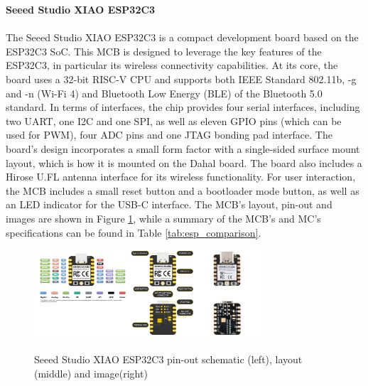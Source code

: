 \textbf{Seeed Studio XIAO ESP32C3}\\\\
The Seeed Studio XIAO ESP32C3 is a compact development board based on the ESP32C3 SoC. This MCB is designed to leverage the key features of the ESP32C3, in particular its wireless connectivity capabilities. At its core, the board uses a 32-bit RISC-V CPU and supports both IEEE Standard 802.11b, -g and -n (Wi-Fi 4) and Bluetooth Low Energy (BLE) of the Bluetooth 5.0 standard. 
In terms of interfaces, the chip provides four serial interfaces, including two UART, one I2C and one SPI, as well as eleven GPIO pins (which can be used for PWM), four ADC pins and one JTAG bonding pad interface. 
The board's design incorporates a small form factor with a single-sided surface mount layout, which is how it is mounted on the Dahal board. The board also includes a Hirose U.FL antenna interface for its wireless functionality. For user interaction, the MCB includes a small reset button and a bootloader mode button, as well as an LED indicator for the USB-C interface. The MCB's layout, pin-out and images are shown in Figure \ref{fig:esp32c3}, while a summary of the MCB's and MC's specifications can be found in Table \ref{tab:esp_comparison}. \citep{espressif_systems_esp32-c3_2024, seeed_studio_seeed_2024-2}

\begin{figure}[H]
    \centering
    \includegraphics[width=0.75\textwidth]{overleaf/images/xiaoesp32c3.png}
    \\\vspace{\ftspace}
    \caption{Seeed Studio XIAO ESP32C3 pin-out schematic (left), layout (middle) and image(right) \citep[adapted from][]{seeed_studio_seeed_2024-2}}
    \label{fig:esp32c3}
\end{figure}

